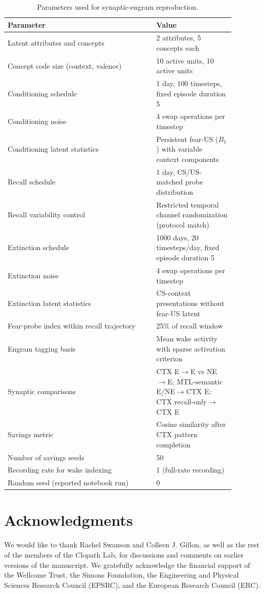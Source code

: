 \documentclass{article}
\begin{document}
\begin{table}[ht]
\centering
\caption{Parameters used for synaptic-engram reproduction.}
\label{tab:synaptic_engrams_parameters}
\begin{tabular}{p{0.58\linewidth}p{0.30\linewidth}}
\toprule
\textbf{Parameter} & \textbf{Value} \\
\midrule
Latent attributes and concepts & 2 attributes, 5 concepts each \\
Concept code size (context, valence) & 10 active units, 10 active units \\
Conditioning schedule & 1 day, 100 timesteps, fixed episode duration 5 \\
Conditioning noise & 4 swap operations per timestep \\
Conditioning latent statistics & Persistent fear-US ($B_1$) with variable context components \\
Recall schedule & 1 day, CS/US-matched probe distribution \\
Recall variability control & Restricted temporal channel randomization (protocol match) \\
Extinction schedule & 1000 days, 20 timesteps/day, fixed episode duration 5 \\
Extinction noise & 4 swap operations per timestep \\
Extinction latent statistics & CS-context presentations without fear-US latent \\
Fear-probe index within recall trajectory & 25\% of recall window \\
Engram tagging basis & Mean wake activity with sparse activation criterion \\
Synaptic comparisons & CTX E$\rightarrow$E vs NE$\rightarrow$E; MTL-semantic E/NE$\rightarrow$CTX E; CTX recall-only$\rightarrow$CTX E \\
Savings metric & Cosine similarity after CTX pattern completion \\
Number of savings seeds & 50 \\
Recording rate for wake indexing & 1 (full-rate recording) \\
Random seed (reported notebook run) & 0 \\
\bottomrule
\end{tabular}
\end{table}

\section*{Acknowledgments}
We would like to thank Rachel Swanson and Colleen J. Gillon, as well as the rest of the members of the Clopath Lab, for discussions and  comments on earlier versions of the manuscript. We gratefully acknowledge the financial support of the Wellcome Trust, the Simons Foundation, the Engineering and Physical Sciences Research Council (EPSRC), and the European Research Council (ERC).
\end{document}
